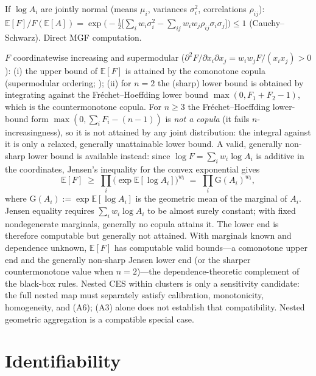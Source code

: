 \begin{lemma}
If $\log A_i$ are jointly normal (means $\mu_i$, variances $\sigma_i^2$,
correlations $\rho_{ij}$):
$\mathbb{E}[F]/F(\mathbb{E}[A])=
\exp\bigl(-\tfrac12\bigl[\sum_iw_i\sigma_i^2-\sum_{ij}w_iw_j\rho_{ij}\sigma_i\sigma_j\bigr]\bigr)\le1$
(Cauchy--Schwarz). Direct MGF computation.
\end{lemma}

\begin{proposition}\label{prop:copula-bounds}
$F$ coordinatewise increasing and supermodular
($\partial^2F/\partial x_i\partial x_j=w_iw_jF/(x_ix_j)>0$): (i) the upper
bound of $\mathbb{E}[F]$ is attained by the comonotone copula
(supermodular ordering; \citealp{tchen1980,muller_stoyan2002}); (ii) for
$n=2$ the (sharp) lower bound is obtained by integrating against the
Fr\'echet--Hoeffding lower bound $\max(0,F_1+F_2-1)$, which is the
countermonotone copula. For $n\ge3$ the Fr\'echet--Hoeffding lower-bound
form $\max(0,\sum_iF_i-(n-1))$ is \emph{not a copula} (it fails
$n$-increasingness), so it is not attained by any joint distribution: the
integral against it is only a relaxed, generally unattainable lower bound.
A valid, generally non-sharp lower bound is available instead: since
$\log F=\sum_iw_i\log A_i$ is additive in the coordinates, Jensen's
inequality for the convex exponential gives
\[
\mathbb{E}[F]\;\ge\;\prod_i\bigl(\exp\mathbb{E}[\log A_i]\bigr)^{w_i}
\;=\;\prod_i \mathrm{G}(A_i)^{w_i},
\]
where $\mathrm{G}(A_i):=\exp\mathbb{E}[\log A_i]$ is the geometric mean of
the marginal of $A_i$. Jensen equality requires
$\sum_iw_i\log A_i$ to be almost surely constant; with fixed nondegenerate
marginals, generally no copula attains it. The lower end is therefore
computable but generally not attained. With marginals known and dependence
unknown, $\mathbb{E}[F]$ has computable valid bounds---a comonotone upper
end and the generally non-sharp Jensen lower end (or the sharper
countermonotone value when $n=2$)---the dependence-theoretic complement of
the black-box rules. Nested CES within
clusters is only a sensitivity candidate: the full nested map must separately
satisfy calibration, monotonicity, homogeneity, and (A6); (A3) alone does not
establish that compatibility. Nested geometric aggregation is a compatible
special case.
\end{proposition}

\section{Identifiability}\label{app:identifiability}

